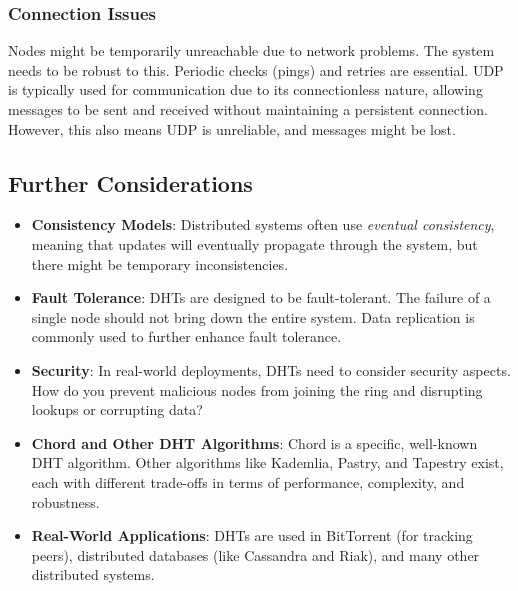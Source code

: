 \subsubsection{Connection Issues}

Nodes might be temporarily unreachable due to network problems. The system needs to be robust to this.  Periodic checks (pings) and retries are essential.  UDP is typically used for communication due to its connectionless nature, allowing messages to be sent and received without maintaining a persistent connection.  However, this also means UDP is unreliable, and messages might be lost.

\subsection{Further Considerations}
\begin{itemize}[itemsep=1pt, topsep=1pt]
\item \textbf{Consistency Models}: Distributed systems often use \textit{eventual consistency}, meaning that updates will eventually propagate through the system, but there might be temporary inconsistencies.

\item \textbf{Fault Tolerance}:  DHTs are designed to be fault-tolerant.  The failure of a single node should not bring down the entire system. Data replication is commonly used to further enhance fault tolerance.

\item \textbf{Security}:  In real-world deployments, DHTs need to consider security aspects.  How do you prevent malicious nodes from joining the ring and disrupting lookups or corrupting data?

\item \textbf{Chord and Other DHT Algorithms}: Chord is a specific, well-known DHT algorithm. Other algorithms like Kademlia, Pastry, and Tapestry exist, each with different trade-offs in terms of performance, complexity, and robustness.

\item \textbf{Real-World Applications}: DHTs are used in BitTorrent (for tracking peers), distributed databases (like Cassandra and Riak), and many other distributed systems.
\end{itemize}



